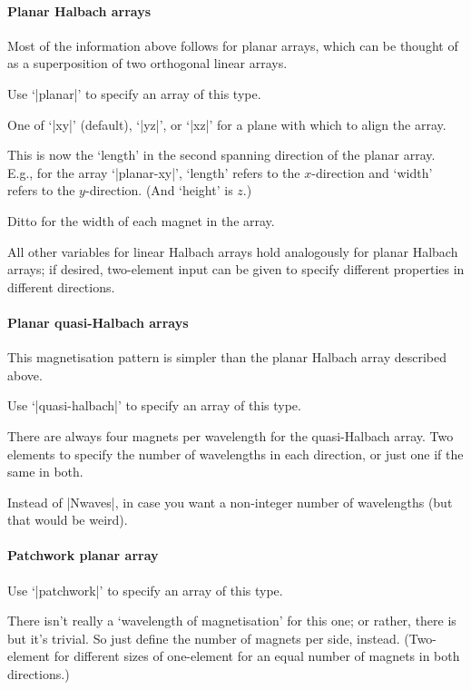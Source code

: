 \documentclass{article}
\begin{document}
\paragraph{Planar Halbach arrays}
Most of the information above follows for planar arrays, which can be thought
of as a superposition of two orthogonal linear arrays.
\begin{description}[noitemsep,font=\ttfamily]
\item[array.type] Use `|planar|' to specify an array of this type.
\item[array.align] One of `|xy|' (default), `|yz|', or `|xz|' for a plane with which to align the array.
\item[array.width] This is now the `length' in the second spanning direction of the planar array. E.g., for the array `|planar-xy|', `length' refers to the $x$-direction and `width' refers to the $y$-direction. (And `height' is $z$.)
\item[array.mwidth] Ditto for the width of each magnet in the array.
\end{description}
All other variables for linear Halbach arrays hold analogously for planar Halbach arrays; if desired, two-element input can be given to specify different properties in different directions.

\paragraph{Planar quasi-Halbach arrays}
This magnetisation pattern is simpler than the planar Halbach array described above.
\begin{description}[noitemsep,font=\ttfamily]
\item[array.type] Use `|quasi-halbach|' to specify an array of this type.
\item[array.Nwaves] There are always four magnets per wavelength for the quasi-Halbach array. Two elements to specify the number of wavelengths in each direction, or just one if the same in both.
\item[array.Nmag] Instead of |Nwaves|, in case you want a non-integer number of wavelengths (but that would be weird).
\end{description}

\paragraph{Patchwork planar array}
\begin{description}[noitemsep,font=\ttfamily]
\item[array.type] Use `|patchwork|' to specify an array of this type.
\item[array.Nmag] There isn't really a `wavelength of magnetisation' for this one; or rather, there is but it's trivial. So just define the number of magnets per side, instead. (Two-element for different sizes of one-element for an equal number of magnets in both directions.)
\end{description}
\end{document}
